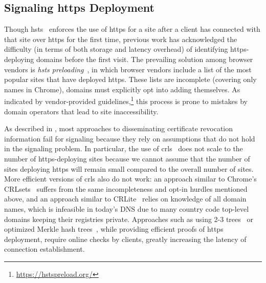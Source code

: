 \subsection{Signaling \ac{https} Deployment}

Though \ac{hsts}~\cite{rfc6797} enforces the use of \ac{https} for a site after
a client has connected with that site over \ac{https} for the first time,
previous work has acknowledged the difficulty (in terms of both storage and
latency overhead) of identifying \ac{https}-deploying domains before the first
visit. The prevailing solution among browser vendors is \emph{\ac{hsts}
preloading}~\cite{keeler2012preloading}, in which browser vendors include a list
of the most popular sites that have deployed \ac{https}. These lists are
incomplete (covering only  names in Chrome), domains must
explicitly opt into adding themselves. As indicated by vendor-provided
guidelines,\footnote{\url{https://hstspreload.org/}} this process is prone to
mistakes by domain operators that lead to site inaccessibility.

As described in ,
most approaches to disseminating certificate revocation information fail for
signaling because they rely on assumptions that do not hold in the signaling
problem. In particular, the use of \acp{crl}~\cite{rfc5280} does not scale to
the number of \ac{https}-deploying sites because we cannot assume that the
number of sites deploying \ac{https} will remain small compared to the overall
number of sites. More efficient versions of \acp{crl} also do not work: an
approach similar to Chrome's CRLsets~\cite{langley2012revocation} suffers from
the same incompleteness and opt-in hurdles mentioned above, and an approach
similar to CRLite~\cite{larisch2017crlite} relies on knowledge of all domain
names, which is infeasible in today's DNS due to many country code top-level
domains keeping their registries private. Approaches such as using 2-3
trees~\cite{naor1998certificate} or optimized Merkle hash
trees~\cite{laurie2012revocation}, while providing efficient proofs of
\ac{https} deployment, require online checks by clients, greatly increasing the
latency of connection establishment.
